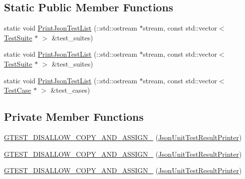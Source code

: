 \subsection*{Static Public Member Functions}
\begin{DoxyCompactItemize}
\item 
static void \mbox{\hyperlink{classtesting_1_1internal_1_1_json_unit_test_result_printer_a74ace014d7b4ea7b03697365887b3e30}{Print\+Json\+Test\+List}} (\+::std\+::ostream $\ast$stream, const std\+::vector$<$ \mbox{\hyperlink{classtesting_1_1_test_suite}{Test\+Suite}} $\ast$ $>$ \&test\+\_\+suites)
\item 
static void \mbox{\hyperlink{classtesting_1_1internal_1_1_json_unit_test_result_printer_a74ace014d7b4ea7b03697365887b3e30}{Print\+Json\+Test\+List}} (\+::std\+::ostream $\ast$stream, const std\+::vector$<$ \mbox{\hyperlink{classtesting_1_1_test_suite}{Test\+Suite}} $\ast$ $>$ \&test\+\_\+suites)
\item 
static void \mbox{\hyperlink{classtesting_1_1internal_1_1_json_unit_test_result_printer_a94acbf2c346bf8845510055f2a4057e9}{Print\+Json\+Test\+List}} (\+::std\+::ostream $\ast$stream, const std\+::vector$<$ \mbox{\hyperlink{classtesting_1_1_test_case}{Test\+Case}} $\ast$ $>$ \&test\+\_\+cases)
\end{DoxyCompactItemize}
\subsection*{Private Member Functions}
\begin{DoxyCompactItemize}
\item 
\mbox{\hyperlink{classtesting_1_1internal_1_1_json_unit_test_result_printer_a523698d681147f4315e3a66bc8ab1a72}{G\+T\+E\+S\+T\+\_\+\+D\+I\+S\+A\+L\+L\+O\+W\+\_\+\+C\+O\+P\+Y\+\_\+\+A\+N\+D\+\_\+\+A\+S\+S\+I\+G\+N\+\_\+}} (\mbox{\hyperlink{classtesting_1_1internal_1_1_json_unit_test_result_printer}{Json\+Unit\+Test\+Result\+Printer}})
\item 
\mbox{\hyperlink{classtesting_1_1internal_1_1_json_unit_test_result_printer_a523698d681147f4315e3a66bc8ab1a72}{G\+T\+E\+S\+T\+\_\+\+D\+I\+S\+A\+L\+L\+O\+W\+\_\+\+C\+O\+P\+Y\+\_\+\+A\+N\+D\+\_\+\+A\+S\+S\+I\+G\+N\+\_\+}} (\mbox{\hyperlink{classtesting_1_1internal_1_1_json_unit_test_result_printer}{Json\+Unit\+Test\+Result\+Printer}})
\item 
\mbox{\hyperlink{classtesting_1_1internal_1_1_json_unit_test_result_printer_a523698d681147f4315e3a66bc8ab1a72}{G\+T\+E\+S\+T\+\_\+\+D\+I\+S\+A\+L\+L\+O\+W\+\_\+\+C\+O\+P\+Y\+\_\+\+A\+N\+D\+\_\+\+A\+S\+S\+I\+G\+N\+\_\+}} (\mbox{\hyperlink{classtesting_1_1internal_1_1_json_unit_test_result_printer}{Json\+Unit\+Test\+Result\+Printer}})
\end{DoxyCompactItemize}
